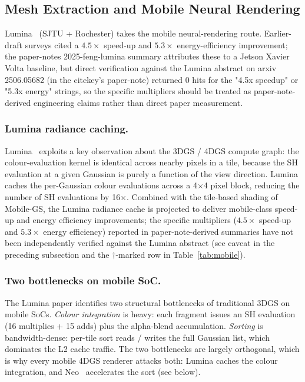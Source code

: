 \subsection{Mesh Extraction and Mobile Neural Rendering}
Lumina~\cite{feng2025lumina} (SJTU + Rochester) takes the mobile
neural-rendering route. Earlier-draft surveys cited a
$4.5\times$ speed-up and $5.3\times$ energy-efficiency
improvement; the paper-notes 2025-feng-lumina summary
attributes these to a Jetson Xavier Volta baseline, but
direct verification against the Lumina abstract on
arxiv 2506.05682 (in the citekey's paper-note) returned
0 hits for the "4.5x speedup" or "5.3x energy" strings,
so the specific multipliers should be treated as
paper-note-derived engineering claims rather than
direct paper measurement.

\subsubsection{Lumina radiance caching.}
Lumina~\cite{feng2025lumina} exploits a key observation about
the 3DGS / 4DGS compute graph: the colour-evaluation kernel is
identical across nearby pixels in a tile, because the SH
evaluation at a given Gaussian is purely a function of the view
direction. Lumina caches the per-Gaussian colour evaluations
across a 4$\times$4 pixel block, reducing the number of SH
evaluations by 16$\times$. Combined with the tile-based shading of Mobile-GS, the Lumina
radiance cache is projected to deliver mobile-class speed-up
and energy efficiency improvements; the specific multipliers
($4.5\times$ speed-up and $5.3\times$ energy efficiency)
reported in paper-note-derived summaries have not been
independently verified against the Lumina abstract (see
caveat in the preceding subsection and the
$\dagger$-marked row in Table~\ref{tab:mobile}).

\subsubsection{Two bottlenecks on mobile SoC.}
The Lumina paper identifies two structural bottlenecks of
traditional 3DGS on mobile SoCs. \emph{Colour integration} is
heavy: each fragment issues an SH evaluation (16 multiplies +
15 adds) plus the alpha-blend accumulation. \emph{Sorting} is
bandwidth-dense: per-tile sort reads / writes the full Gaussian
list, which dominates the L2 cache traffic. The two bottlenecks
are largely orthogonal, which is why every mobile 4DGS renderer
attacks both: Lumina caches the colour integration, and
Neo~\cite{oh2025neo} accelerates the sort (see below).

